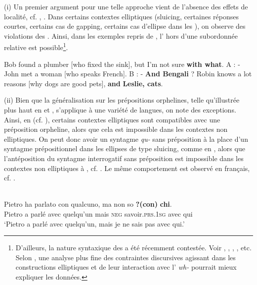 (i) Un premier argument pour une telle approche vient de l’absence des effets de localité, cf. \citet{CulicoverEtAl2005}, \citet{Stainton2006}. Dans certains con\-textes elliptiques (sluicing, certaines réponses courtes, certains cas de gapping, certains cas d’ellipse dans les ), on observe des violations des . Ainsi, dans les exemples  repris de \citet{CulicoverEtAl2005}, l’ hors d’une subordonnée relative est possible\footnote{D’ailleurs, la nature syntaxique des  a été récemment contestée. Voir \citet{Kluender1998}, \citet{FanselowEtAl2006}, \citet{AmbridgeEtAl2008}, \citet{HofmeisterEtAl2010}, etc. Selon \citet{GinzburgEtAlToAppear}, une analyse plus fine des contraintes discursives agissant dans les constructions elliptiques et de leur interaction avec l' \textit{wh-} pourrait mieux expliquer les données.}.

\ea \label{ch1:ex127}
\ea  Bob found a plumber [who fixed the sink], but I’m not sure \textbf{with what}. 
\ex  A : - John met a woman [who speaks French]. B : - \textbf{And Bengali} ?
\ex  Robin knows a lot reasons [why dogs are good pets], \textbf{and} \textbf{Leslie, cats}. 
\z
\z

(ii) Bien que la généralisation sur les prépositions orphelines, telle qu’illustrée plus haut en  et , s’applique à une variété de langues, on note des exceptions. Ainsi, en  (cf. \citealt{Merchant2001}), certains contextes elliptiques sont compatibles avec une préposition orpheline, alors que cela est impossible dans les contextes non elliptiques. On peut donc avoir un syntagme \textit{qu-} sans préposition à la place d’un syntagme prépositionnel dans les ellipses de type sluicing, comme en , alors que l’antéposition du syntagme interrogatif sans préposition est impossible dans les contextes non elliptiques à , cf. . Le même comportement est observé en français, cf. .

\ea
{}\\
\ea \label{ch1:ex128a}
\gll Pietro ha parlato con qualcuno, ma non so \textbf{?(con)} \textbf{chi}.\\ Pietro a parlé avec quelqu’un mais \textsc{neg} savoir.\textsc{prs.1sg} avec qui\\
\glt ‘Pietro a parlé avec quelqu’un, mais je ne sais pas avec qui.’ 

